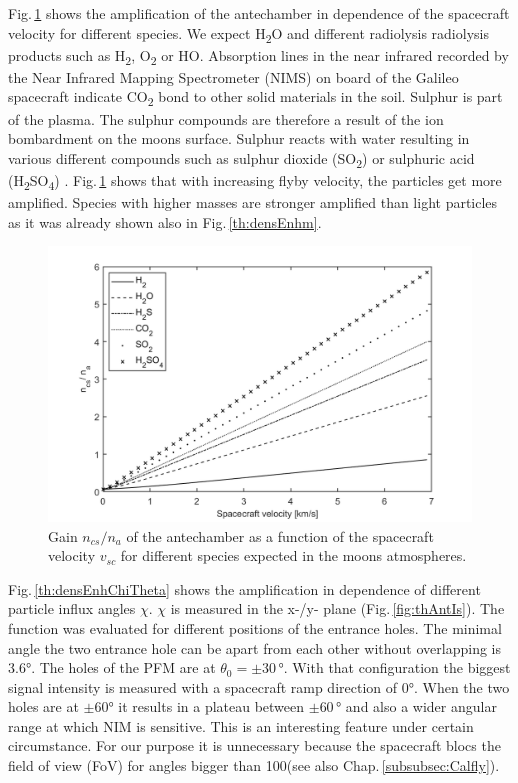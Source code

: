 		Fig.\,\ref{th:densEnhvelo} shows the amplification of the antechamber in dependence of the spacecraft velocity for different species. We expect H\textsubscript{2}O and different radiolysis radiolysis products such as H\textsubscript{2}, O\textsubscript{2} or HO. Absorption lines in the near infrared recorded by the Near Infrared Mapping Spectrometer (NIMS) on board of the Galileo spacecraft indicate CO\textsubscript{2} bond to other solid materials in the soil. Sulphur is part of the plasma. The sulphur compounds are therefore a result of the ion bombardment on the moons surface. Sulphur reacts with water resulting in various different compounds such as sulphur dioxide (SO\textsubscript{2}) or sulphuric acid (H\textsubscript{2}SO\textsubscript{4}) \cite{Collins_2014}. 
		Fig.\,\ref{th:densEnhvelo} shows that with increasing flyby velocity, the particles get more amplified. Species with higher masses are stronger amplified than light particles as it was already shown also in Fig.\,\ref{th:densEnhm}.\\
		\begin{figure}[h!] %
			\centering
			\includegraphics[width= .7\textwidth]{Bilder/velocity.png}
			\caption{Gain $n_{cs}/n_a$ of the antechamber as a function of the spacecraft velocity $v_{sc}$ for different species expected in the moons atmospheres.}
			\label{th:densEnhvelo}
		\end{figure}
		Fig.\,\ref{th:densEnhChiTheta} shows the amplification in dependence of different particle influx angles $\chi$. $\chi$ is measured in the x-/y- plane (Fig.\,\ref{fig:thAntIs}). The function was evaluated for different positions of the entrance holes. The minimal angle the two entrance hole can be apart from each other without overlapping is 3.6\si{\degree}. The holes of the PFM are at $\theta_0 = \pm30\,\si{\degree}$. With that configuration the biggest signal intensity is measured with a spacecraft ramp direction of 0\si{\degree}. When the two holes are at $\pm$60\si{\degree} it results in a plateau between $\pm$60\,\si{\degree} and also a wider angular range at which NIM is sensitive. This is an interesting feature under certain circumstance. For our purpose it is unnecessary because the spacecraft blocs the field of view (FoV) for angles bigger than 100\degree (see also Chap.\,\ref{subsubsec:Calfly}).
